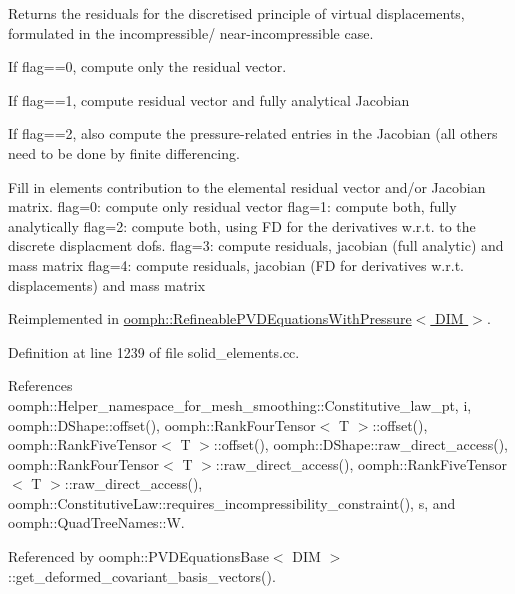 Returns the residuals for the discretised principle of virtual displacements, formulated in the incompressible/ near-\/incompressible case. 


\begin{DoxyItemize}
\item If flag==0, compute only the residual vector.
\item If flag==1, compute residual vector and fully analytical Jacobian
\item If flag==2, also compute the pressure-\/related entries in the Jacobian (all others need to be done by finite differencing.
\end{DoxyItemize}

Fill in element\textquotesingle{}s contribution to the elemental residual vector and/or Jacobian matrix. flag=0\+: compute only residual vector flag=1\+: compute both, fully analytically flag=2\+: compute both, using FD for the derivatives w.\+r.\+t. to the discrete displacment dofs. flag=3\+: compute residuals, jacobian (full analytic) and mass matrix flag=4\+: compute residuals, jacobian (FD for derivatives w.\+r.\+t. displacements) and mass matrix 

Reimplemented in \hyperlink{classoomph_1_1RefineablePVDEquationsWithPressure_a5772ce11dd9bc9e7bdf0a2463fc753d5}{oomph\+::\+Refineable\+P\+V\+D\+Equations\+With\+Pressure$<$ D\+I\+M $>$}.



Definition at line 1239 of file solid\+\_\+elements.\+cc.



References oomph\+::\+Helper\+\_\+namespace\+\_\+for\+\_\+mesh\+\_\+smoothing\+::\+Constitutive\+\_\+law\+\_\+pt, i, oomph\+::\+D\+Shape\+::offset(), oomph\+::\+Rank\+Four\+Tensor$<$ T $>$\+::offset(), oomph\+::\+Rank\+Five\+Tensor$<$ T $>$\+::offset(), oomph\+::\+D\+Shape\+::raw\+\_\+direct\+\_\+access(), oomph\+::\+Rank\+Four\+Tensor$<$ T $>$\+::raw\+\_\+direct\+\_\+access(), oomph\+::\+Rank\+Five\+Tensor$<$ T $>$\+::raw\+\_\+direct\+\_\+access(), oomph\+::\+Constitutive\+Law\+::requires\+\_\+incompressibility\+\_\+constraint(), s, and oomph\+::\+Quad\+Tree\+Names\+::W.



Referenced by oomph\+::\+P\+V\+D\+Equations\+Base$<$ D\+I\+M $>$\+::get\+\_\+deformed\+\_\+covariant\+\_\+basis\+\_\+vectors().

\mbox{\label{classoomph_1_1PVDEquationsWithPressure_a35b1c9e4ebd765bbb185421c2c02aa1a}} 

